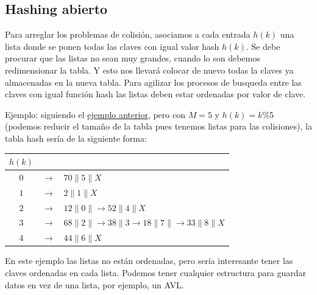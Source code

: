 \documentclass[10pt,a4paper,spanish]{report}
\begin{document}
\subsection{\textcolor[rgb]{0.3,0.4,0.8}Hashing abierto}
\noindent
Para arreglar los problemas de colisión, asociamos a cada entrada $h(k)$ una lista donde se ponen todas las claves con igual valor hash $h(k)$.
Se debe procurar que las listas no sean muy grandes, cuando lo son debemos redimensionar la tabla. Y esto nos llevará colocar de nuevo todas
la claves ya almacenadas en la nueva tabla. 
Para agilizar los procesos de busqueda entre las claves con igual función hash las listas deben estar ordenadas por valor de clave.

\noindent
Ejemplo: siguiendo el \hyperref[ejemplo_hash1]{ejemplo anterior}, pero con $M = 5$ y $h(k) = k \% 5$ (podemos reducir el tamaño de la tabla pues tenemos listas para las colisiones), la tabla hash sería de la siguiente forma:

\begin{center}
\begin{tabular}{c | c l}
$h(k)$ & \\
\hline
$0$ & $\longrightarrow$ & $70 \| 5 \| X$ \\
$1$ & $\longrightarrow$ & $2 \| 1 \| X$\\
$2$ & $\longrightarrow$ & $12 \| 0 \| \longrightarrow 52 \| 4 \| X$\\
$3$ & $\longrightarrow$ & $68 \| 2 \| \longrightarrow 38 \| 3 \longrightarrow 18 \| 7 \| \longrightarrow 33 \| 8 \| X$ \\
$4$ & $\longrightarrow$ & $44 \| 6 \| X$ \\
\end{tabular}
\end{center}
En este ejemplo las listas no están ordenadas, pero sería interesante tener las claves ordenadas en cada lista.
\noindent
Podemos tener cualquier estructura para guardar datos en vez de una lista, por ejemplo, un AVL.
\end{document}
